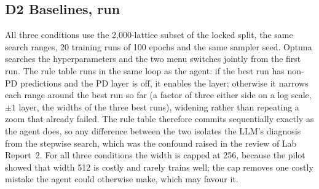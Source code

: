 \documentclass[11pt]{article}
\begin{document}
\subsection*{D2 \quad Baselines, run}
All three conditions use the 2,000-lattice subset of the locked split, the same search ranges,
20 training runs of 100 epochs and the same sampler seed. Optuna searches the hyperparameters and
the two menu switches jointly from the first run. The rule table runs in the same loop as the
agent: if the best run has non-PD predictions and the PD layer is off, it enables the layer;
otherwise it narrows each range around the best run so far (a factor of three either side on a
log scale, $\pm1$ layer, the widths of the three best runs), widening rather than repeating a zoom
that already failed. The rule table therefore commits sequentially exactly as the agent does, so
any difference between the two isolates the LLM's diagnosis from the stepwise search, which was
the confound raised in the review of Lab Report~2. For all three conditions the width is capped at
256, because the pilot showed that width 512 is costly and rarely trains well; the cap removes one
costly mistake the agent could otherwise make, which may favour it.
\end{document}
